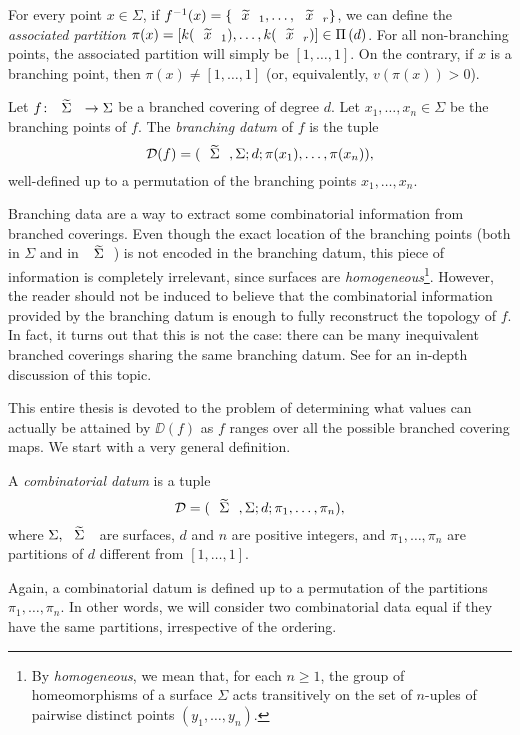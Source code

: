 For every point $x\in\Sigma$, if $f^{-1}(x)=\{\wtilde{x}_1,\ldots,\wtilde{x}_r\}$, we can define the \emph{associated partition} $\pi(x)=[k(\wtilde{x}_1),\ldots,k(\wtilde{x}_r)]\in\Partitions{d}$. For all non-branching points, the associated partition will simply be $[1,\ldots,1]$. On the contrary, if $x$ is a branching point, then $\pi(x)\neq[1,\ldots,1]$ (or, equivalently, $v(\pi(x))>0$).

\begin{definition}
Let $\map{f}{\tSigma}{\Sigma}$ be a branched covering of degree $d$. Let $x_1,\ldots,x_n\in\Sigma$ be the branching points of $f$. The \emph{branching datum} of $f$ is the tuple
\[
\DD(f)=\datum{\tSigma,\Sigma}{d}{\pi(x_1),\ldots,\pi(x_n)},
\]
well-defined up to a permutation of the branching points $x_1,\ldots,x_n$.
\end{definition}

Branching data are a way to extract some combinatorial information from branched coverings. Even though the exact location of the branching points (both in $\Sigma$ and in $\tSigma$) is not encoded in the branching datum, this piece of information is completely irrelevant, since surfaces are \emph{homogeneous}\footnote{By \emph{homogeneous}, we mean that, for each $n\ge 1$, the group of homeomorphisms of a surface $\Sigma$ acts transitively on the set of $n$-uples of pairwise distinct points $(y_1,\ldots,y_n)$.}. However, the reader should not be induced to believe that the combinatorial information provided by the branching datum is enough to fully reconstruct the topology of $f$. In fact, it turns out that this is not the case: there can be many inequivalent branched coverings sharing the same branching datum. See \cite{sarti} for an in-depth discussion of this topic.

This entire thesis is devoted to the problem of determining what values can actually be attained by $\DD(f)$ as $f$ ranges over all the possible branched covering maps. We start with a very general definition.

\begin{definition}
A \emph{combinatorial datum} is a tuple
\[
\DD=\datum{\tSigma,\Sigma}{d}{\pi_1,\ldots,\pi_n},
\]
where $\Sigma,\tSigma$ are surfaces, $d$ and $n$ are positive integers, and $\pi_1,\ldots,\pi_n$ are partitions of $d$ different from $[1,\ldots,1]$.
\end{definition}

Again, a combinatorial datum is defined up to a permutation of the partitions $\pi_1,\ldots,\pi_n$. In other words, we will consider two combinatorial data equal if they have the same partitions, irrespective of the ordering.

